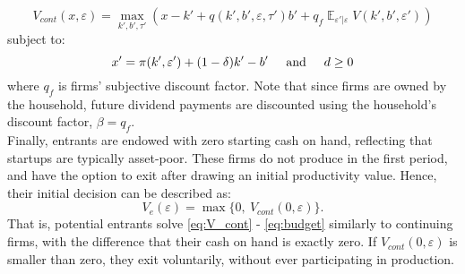 \documentclass[12pt]{article}
\DeclareMathOperator{\E}{\mathbb{E}}
\begin{document}
\begin{equation} \label{eq:V_cont}
    V_{cont}(x,\varepsilon) = \max_{k',b', \tau'} \left(x - k' +  q(k',b',\varepsilon, \tau')b' + q_f \E_{\varepsilon'|\varepsilon} V(k',b', \varepsilon') \right)
\end{equation}
subject to: 
\begin{equation} \label{eq:budget}
x' = \pi(k',\varepsilon')+(1-\delta)k'-b' \hspace{5mm} \text{and} \hspace{5mm} d \geq 0
\end{equation} 
where $q_f$ is firms' subjective discount factor. Note that since firms are owned by the household, future dividend payments are discounted using the household's discount factor, $\beta = q_f$.  \vspace{3mm} \\
Finally, entrants are endowed with zero starting cash on hand, reflecting that startups are typically asset-poor. These firms do not produce in the first period, and have the option to exit after drawing an initial productivity value. Hence, their initial decision can be described as: 
\begin{equation} \label{eq:entrant decision}
    V_e(\varepsilon) = \max \{0,  \ V_{cont}(0,\varepsilon) \}.
\end{equation}
That is, potential entrants solve \ref{eq:V_cont} - \ref{eq:budget} similarly to continuing firms, with the difference that their cash on hand is exactly zero. If $V_{cont}(0,\varepsilon)$ is smaller than zero, they exit voluntarily, without ever participating in production.
\end{document}

